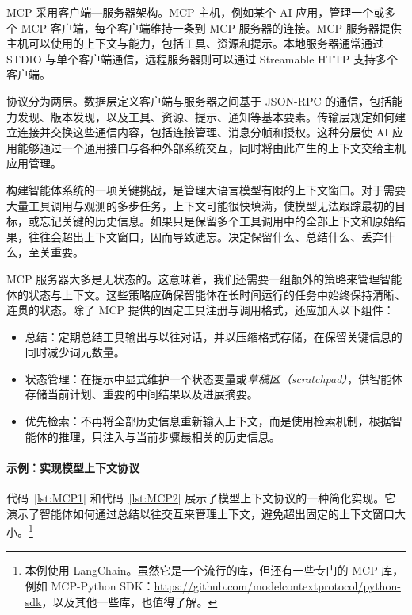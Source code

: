 MCP 采用客户端—服务器架构。MCP 主机，例如某个 AI 应用，管理一个或多个 MCP 客户端，每个客户端维持一条到 MCP 服务器的连接。MCP 服务器提供主机可以使用的上下文与能力，包括工具、资源和提示。本地服务器通常通过 STDIO 与单个客户端通信，远程服务器则可以通过 Streamable HTTP 支持多个客户端。

协议分为两层。数据层定义客户端与服务器之间基于 JSON-RPC 的通信，包括能力发现、版本发现，以及工具、资源、提示、通知等基本要素。传输层规定如何建立连接并交换这些通信内容，包括连接管理、消息分帧和授权。这种分层使 AI 应用能够通过一个通用接口与各种外部系统交互，同时将由此产生的上下文交给主机应用管理。

构建智能体系统的一项关键挑战，是管理大语言模型有限的上下文窗口。对于需要大量工具调用与观测的多步任务，上下文可能很快填满，使模型无法跟踪最初的目标，或忘记关键的历史信息。如果只是保留多个工具调用中的全部上下文和原始结果，往往会超出上下文窗口，因而导致遗忘。决定保留什么、总结什么、丢弃什么，至关重要。

MCP 服务器大多是无状态的。这意味着，我们还需要一组额外的策略来管理智能体的状态与上下文。这些策略应确保智能体在长时间运行的任务中始终保持清晰、连贯的状态。除了 MCP 提供的固定工具注册与调用格式，还应加入以下组件：

\begin{itemize}
    \item 总结：定期总结工具输出与以往对话，并以压缩格式存储，在保留关键信息的同时减少词元数量。
    \item 状态管理：在提示中显式维护一个状态变量或{\em 草稿区（scratchpad）}，供智能体存储当前计划、重要的中间结果以及进展摘要。
    \item 优先检索：不再将全部历史信息重新输入上下文，而是使用检索机制，根据智能体的推理，只注入与当前步骤最相关的历史信息。
\end{itemize}


\paragraph{示例：实现模型上下文协议}
代码~\ref{lst:MCP1} 和代码~\ref{lst:MCP2} 展示了模型上下文协议的一种简化实现。它演示了智能体如何通过总结以往交互来管理上下文，避免超出固定的上下文窗口大小。\footnote{本例使用 LangChain。虽然它是一个流行的库，但还有一些专门的 MCP 库，例如 MCP-Python SDK：\url{https://github.com/modelcontextprotocol/python-sdk}，以及其他一些库，也值得了解。}

